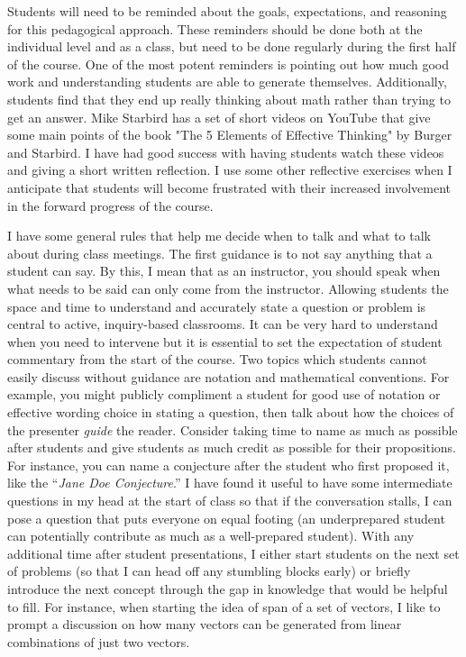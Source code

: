 \begin{annotation}
Students will need to be reminded  about the goals, expectations, and reasoning for this pedagogical approach. These reminders should be done both at the individual level and as a class, but need to be done regularly during the first half of the course. One of the most potent reminders is pointing out how much good work and understanding students are able to generate themselves. Additionally, students find that they end up really thinking about math rather than trying to get an answer. Mike Starbird has a set of short videos on YouTube that give some main points of the book "The 5 Elements of Effective Thinking" by Burger and Starbird. I have had good success with having students watch these videos and giving a short written reflection. I use  some other reflective exercises when I anticipate that students will become frustrated with their increased involvement in the forward progress of the course.

I have some general rules that help me decide when to talk and what to talk about during class meetings. The first guidance is to not say anything that a student can say. By this, I mean that as an instructor, you should speak when what needs to be said can only come from the instructor. Allowing students the space and time to understand and accurately state a question or problem is central to active, inquiry-based classrooms. It can be very hard to understand when you need to intervene but it is essential to set the expectation of  student commentary from the start of the course. Two topics which students cannot easily discuss without guidance are notation and mathematical conventions. For example, you might publicly compliment a student  for good use of notation or effective wording choice in stating  a question, then talk about how the choices of the presenter \emph{guide} the reader. Consider  taking time to name as much as possible after students and give students as much credit as possible for their propositions. For instance, you can name a conjecture after the student who first proposed it, like the “\emph{Jane Doe Conjecture}.” I have found it useful to have some intermediate questions in my head at the start of class so that if the conversation stalls, I can pose a question that puts everyone on equal footing (an underprepared student can potentially contribute as much as a well-prepared student). With any additional time after student presentations, I either start students  on the next set of problems (so that I can head off any stumbling blocks early) or briefly introduce the next concept through the gap in knowledge that would be helpful to fill. For instance, when starting the idea of span of a set of vectors, I like to prompt a discussion on how many vectors can be generated from linear combinations of just two vectors.



\end{annotation}
